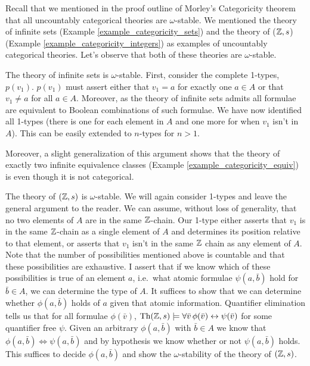 Recall that we mentioned in the proof outline of Morley's Categoricity theorem that all uncountably categorical theories are \(\omega\)-stable. 
We mentioned the theory of infinite sets (Example \ref{example_categoricity_sets}) and the theory of (\(\mathbb{Z}, s\)) (Example \ref{example_categoricity_integers}) as examples of uncountably categorical theories. 
Let's observe that both of these theories are \(\omega\)-stable. 

\begin{example}\label{example_omst_sets}
The theory of infinite sets is \(\omega\)-stable. 
First, consider the complete 1-types, \(p(v_1)\). \(p(v_1)\) must assert either that \(v_1 = a\) for exactly one \(a \in A\) or that \(v_1 \neq a\) for all \(a \in A\). 
Moreover, as the theory of infinite sets admits \qe \cite{mar} all formulae are equivalent to Boolean combinations of such formulae.
We have now identified all 1-types (there is one for each element in \(A\) and one more for when \(v_1\) isn't in \(A\)). 
This can be easily extended to \(n\)-types for \(n > 1\).

Moreover, a slight generalization of this argument shows that the theory of exactly two infinite equivalence classes (Example \ref{example_categoricity_equiv}) is \omst even though it is not categorical. 
\end{example}

\begin{example}\label{example_omst_Z}
The theory of \((\mathbb{Z}, s)\) is \(\omega\)-stable. 
We will again consider 1-types and leave the general argument to the reader. 
We can assume, without loss of generality, that no two elements of \(A\) are in the same \(\mathbb{Z}\)-chain. 
Our 1-type either asserts that \(v_1\) is in the same \(\mathbb{Z}\)-chain as a single element of \(A\) and determines its position relative to that element, or asserts that \(v_1\) isn't in the same \(\mathbb{Z}\) chain as any element of \(A\). 
Note that the number of possibilities mentioned above is countable and that these possibilities are exhaustive.
I assert that if we know which of these possibilities is true of an element \(a\), i.e.\ what atomic formulae \(\psi(a, \bar{b})\) hold for \(\bar{b} \in A\), we can determine the type of \(A\). 
It suffices to show that we can determine whether \(\phi(a, \bar{b})\) holds of \(a\) given that atomic information.  
Quantifier elimination tells us that for all formulae \(\phi(\bar{v})\), \(\text{Th}(\mathbb{Z}, s) \models \forall \bar{v} \, \phi(\bar{v}) \leftrightarrow \psi(\bar{v})\) for some quantifier free \(\psi\).
Given an arbitrary \(\phi(a, \bar{b})\) with \(\bar{b} \in A\) we know that \(\phi(a, \bar{b}) \iff  \psi(a, \bar{b})\) and by hypothesis we know whether or not \(\psi(a, \bar{b})\) holds. 
This suffices to decide \(\phi(a, \bar{b})\) and show the \(\omega\)-stability of the theory of \((\mathbb{Z}, s)\).
\end{example}

